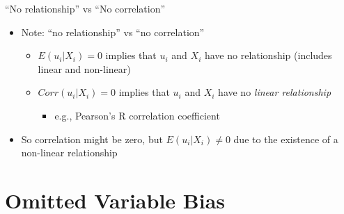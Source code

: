 \documentclass[
  8pt,
  ignorenonframetext,
  dvipsnames]{beamer}
\providecommand{\tightlist}{%
  \setlength{\itemsep}{0pt}\setlength{\parskip}{0pt}}
\let\olditem\item
\renewcommand{\item}{%
  \olditem\vspace{4pt}
}
\begin{document}
\begin{frame}{``No relationship'' vs ``No correlation''}
\protect\hypertarget{no-relationship-vs-no-correlation}{}

\begin{itemize}
\tightlist
\item
  Note: ``no relationship'' vs ``no correlation''

  \begin{itemize}
  \tightlist
  \item
    \(E(u_i|X_i)=0\) implies that \(u_i\) and \(X_i\) have no
    relationship (includes linear and non-linear)
  \item
    \(Corr(u_i|X_i)=0\) implies that \(u_i\) and \(X_i\) have no
    \emph{linear relationship}

    \begin{itemize}
    \tightlist
    \item
      e.g., Pearson's R correlation coefficient
    \end{itemize}
  \end{itemize}
\item
  So correlation might be zero, but \(E(u_i|X_i) \ne 0\) due to the
  existence of a non-linear relationship
\end{itemize}

\end{frame}

\hypertarget{omitted-variable-bias}{%
\section{Omitted Variable Bias}\label{omitted-variable-bias}}
\end{document}
